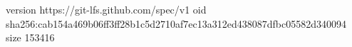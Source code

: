 version https://git-lfs.github.com/spec/v1
oid sha256:cab154a469b06ff3ff28b1c5d2710af7ec13a312ed438087dfbc05582d340094
size 153416
